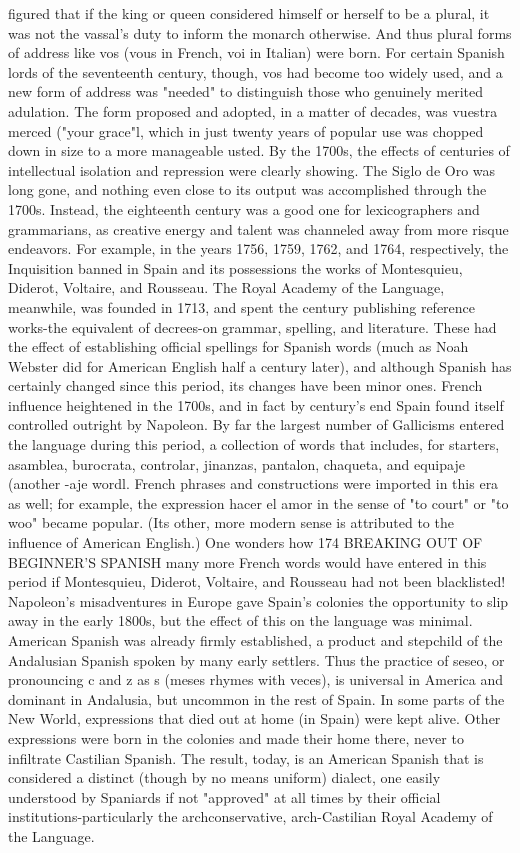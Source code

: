 figured that if the king or queen considered himself or herself to be a
plural, it was not the vassal's duty to inform the monarch otherwise.
And thus plural forms of address like vos (vous in French, voi in Italian) were born. For certain Spanish lords of the seventeenth century,
though, vos had become too widely used, and a new form of address
was "needed" to distinguish those who genuinely merited adulation.
The form proposed and adopted, in a matter of decades, was vuestra
merced ("your grace"l, which in just twenty years of popular use was
chopped down in size to a more manageable usted.
By the 1700s, the effects of centuries of intellectual isolation
and repression were clearly showing. The Siglo de Oro was long gone,
and nothing even close to its output was accomplished through the
1700s. Instead, the eighteenth century was a good one for lexicographers and grammarians, as creative energy and talent was channeled
away from more risque endeavors. For example, in the years 1756,
1759, 1762, and 1764, respectively, the Inquisition banned in Spain and
its possessions the works of Montesquieu, Diderot, Voltaire, and Rousseau. The Royal Academy of the Language, meanwhile, was founded in
1713, and spent the century publishing reference works-the equivalent of decrees-on grammar, spelling, and literature. These had the
effect of establishing official spellings for Spanish words (much as
Noah Webster did for American English half a century later), and although Spanish has certainly changed since this period, its changes
have been minor ones.
French influence heightened in the 1700s, and in fact by century's end Spain found itself controlled outright by Napoleon. By far
the largest number of Gallicisms entered the language during this period, a collection of words that includes, for starters, asamblea, burocrata, controlar, jinanzas, pantalon, chaqueta, and equipaje (another
-aje wordl. French phrases and constructions were imported in this era
as well; for example, the expression hacer el amor in the sense of "to
court" or "to woo" became popular. (Its other, more modern sense is
attributed to the influence of American English.) One wonders how
174 BREAKING OUT OF BEGINNER'S SPANISH
many more French words would have entered in this period if Montesquieu, Diderot, Voltaire, and Rousseau had not been blacklisted!
Napoleon's misadventures in Europe gave Spain's colonies the
opportunity to slip away in the early 1800s, but the effect of this on
the language was minimal. American Spanish was already firmly established, a product and stepchild of the Andalusian Spanish spoken by
many early settlers. Thus the practice of seseo, or pronouncing c and z
as s (meses rhymes with veces), is universal in America and dominant
in Andalusia, but uncommon in the rest of Spain. In some parts of the
New World, expressions that died out at home (in Spain) were kept
alive. Other expressions were born in the colonies and made their
home there, never to infiltrate Castilian Spanish. The result, today, is
an American Spanish that is considered a distinct (though by no means
uniform) dialect, one easily understood by Spaniards if not "approved"
at all times by their official institutions-particularly the archconservative, arch-Castilian Royal Academy of the Language.

